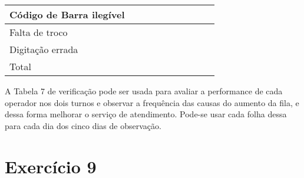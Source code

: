 \documentclass{article}
\begin{document}
\begin{table}[h!]
\begin{tabular}{|llllllllll|}
\multicolumn{1}{|l|}{Código de Barra ilegível}    & \multicolumn{1}{l|}{}  & \multicolumn{1}{l|}{}  & \multicolumn{1}{l|}{}  & \multicolumn{1}{l|}{}  & \multicolumn{1}{l|}{}  & \multicolumn{1}{l|}{}  & \multicolumn{1}{l|}{}  & \multicolumn{1}{l|}{}  &       \\ \hline
\multicolumn{1}{|l|}{Falta de troco}              & \multicolumn{1}{l|}{}  & \multicolumn{1}{l|}{}  & \multicolumn{1}{l|}{}  & \multicolumn{1}{l|}{}  & \multicolumn{1}{l|}{}  & \multicolumn{1}{l|}{}  & \multicolumn{1}{l|}{}  & \multicolumn{1}{l|}{}  &       \\ \hline
\multicolumn{1}{|l|}{Digitação errada}            & \multicolumn{1}{l|}{}  & \multicolumn{1}{l|}{}  & \multicolumn{1}{l|}{}  & \multicolumn{1}{l|}{}  & \multicolumn{1}{l|}{}  & \multicolumn{1}{l|}{}  & \multicolumn{1}{l|}{}  & \multicolumn{1}{l|}{}  &       \\ \hline
\multicolumn{1}{|l|}{Total}                       & \multicolumn{1}{l|}{}  & \multicolumn{1}{l|}{}  & \multicolumn{1}{l|}{}  & \multicolumn{1}{l|}{}  & \multicolumn{1}{l|}{}  & \multicolumn{1}{l|}{}  & \multicolumn{1}{l|}{}  & \multicolumn{1}{l|}{}  &       \\ \hline
\end{tabular}
\end{table}

A Tabela 7 de verificação pode ser usada para avaliar a performance de cada operador nos dois turnos e observar a frequência das causas do aumento da fila, e dessa forma melhorar o serviço de atendimento. Pode-se usar cada folha dessa para cada dia dos cinco dias de observação.

\section*{Exercício 9}
\end{document}
